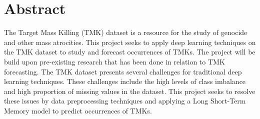 \chapter*{Abstract}\label{abstract}


The Target Mass Killing (TMK) dataset is a resource for the study of genocide and other mass atrocities. This project seeks to apply deep learning techniques on the TMK dataset to study and forecast occurrences of TMKs. The project will be build upon pre-existing research that has been done in relation to TMK forecasting. The TMK dataset presents several challenges for traditional deep learning techniques. These challenges include the high levels of class imbalance and high proportion of missing values in the dataset. This project seeks to resolve these issues by data preprocessing techniques and applying a Long Short-Term Memory model to predict occurrences of TMKs.
